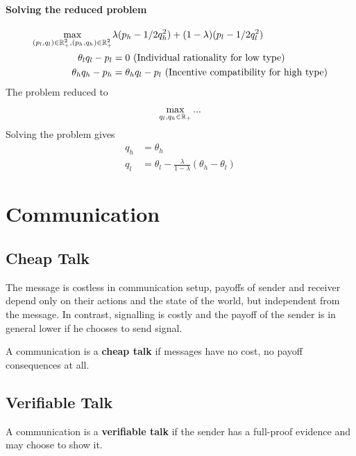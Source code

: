 \documentclass{article}
\begin{document}
   	\paragraph{Solving the reduced problem}
   	\begin{align}
   		\max_{(p_l, q_l) \in \mathbb{R}^2_+, (p_h, q_h) \in \mathbb{R}^2_+} &\lambda (p_h - 1/2 q_h^2) + (1 - \lambda) (p_l - 1/2 q_l^2) \\
   		\theta_l q_l - p_l &= 0 \text{{ (Individual rationality for low type)}} \\
   		\theta_h q_h - p_h &= \theta_h q_l - p_l \text{{ (Incentive compatibility for high type)}}
   	\end{align}
   	The problem reduced to
   	\begin{align}
   		\max_{q_l, q_h \in \mathbb{R}_+} ...
   	\end{align}
   	Solving the problem gives
   	\begin{align}
   		q_h &= \theta_h \\
   		q_l &= \theta_l - \frac{\lambda}{1 - \lambda}(\theta_h - \theta_l)
   	\end{align}
   	
   	\section{Communication}
   	\subsection{Cheap Talk}
   	\begin{remark}
   		The message is costless in communication setup, payoffs of sender and receiver depend only on their actions and the state of the world, but independent from the message. In contrast, signalling is costly and the payoff of the sender is in general lower if he chooses to send signal.
   	\end{remark}
   	
   	\begin{definition}
   		A communication is a \textbf{cheap talk} if messages have no cost, no payoff consequences at all.
   	\end{definition}
   	
   	
   	\subsection{Verifiable Talk}
   	\begin{definition}
   		A communication is a \textbf{verifiable talk} if the sender has a full-proof evidence and may choose to show it.
   	\end{definition}
\end{document}
